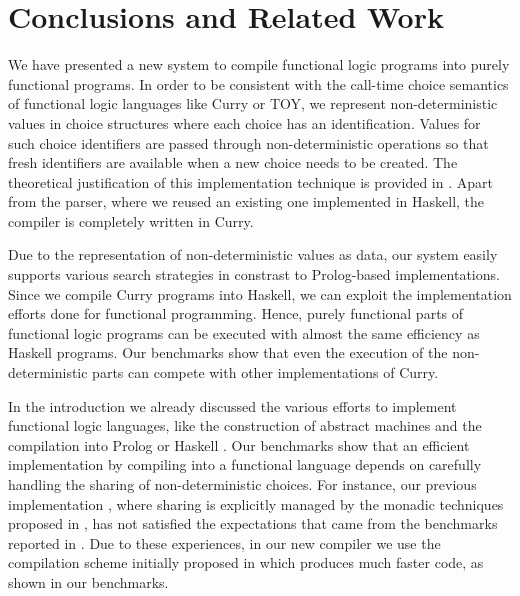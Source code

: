 \documentclass{llncs}
\begin{document}
\section{Conclusions and Related Work}
\label{sec:Conclusions}

We have presented a new system to compile functional logic programs
into purely functional programs.
In order to be consistent with the call-time choice semantics
of functional logic languages like Curry or TOY,
we represent non-deterministic values
in choice structures where each choice has an identification.
Values for such choice identifiers are passed through
non-deterministic operations so that fresh identifiers are available
when a new choice needs to be created.
The theoretical justification of this implementation technique
is provided in \cite{Brassel11Thesis}.
Apart from the parser, where we reused an existing one
implemented in Haskell, the compiler is completely written in Curry.

Due to the representation of non-deterministic values as data,
our system easily supports various search strategies
in constrast to Prolog-based implementations.
Since we compile Curry programs into Haskell,
we can exploit the implementation efforts done
for functional programming.
Hence, purely functional parts of functional logic programs
can be executed with almost the same efficiency as Haskell programs.
Our benchmarks show that even the execution of the
non-deterministic parts can compete with other
implementations of Curry.

In the introduction we already discussed the various
efforts to implement functional logic languages,
like the construction of abstract machines
\cite{AntoyHanusLiuTolmach05,HanusSadre99JFLP,Lux99FLOPS} and
the compilation into Prolog \cite{AntoyHanus00FROCOS}
or Haskell \cite{BrasselFischerHanusReck11,BrasselHuch07,BrasselHuch09}.
Our benchmarks show that an efficient implementation
by compiling into
a functional language depends on carefully handling
the sharing of non-deterministic choices. For instance, our previous
implementation \cite{BrasselFischerHanusReck11}, where sharing
is explicitly managed by the monadic techniques proposed
in \cite{FischerKiselyovShan09}, has not satisfied the expectations
that came from the benchmarks reported in \cite{FischerKiselyovShan09}.
Due to these experiences, in our new compiler we use the
compilation scheme initially proposed in \cite{BrasselFischer08IFL}
which produces much faster code, as shown in our benchmarks.
\end{document}
